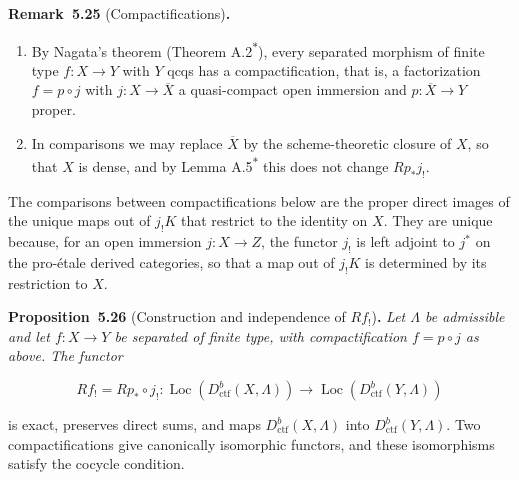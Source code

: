 \documentclass[11pt]{article}
\newenvironment{bpstatement}[2]{\par\addvspace{0.6\baselineskip}\noindent\textbf{#1}#2\textbf{.}\enspace\ignorespaces}
  {\par\addvspace{0.4\baselineskip}}
\newenvironment{bpstatementit}[2]{\begin{bpstatement}{#1}{#2}\itshape\ignorespaces}{\end{bpstatement}}
\newcommand{\bpout}[1]{#1\textsuperscript{\hyperlink{bp-outside}{\ensuremath{\ast}}}}
\providecommand{\Loc}{}\renewcommand{\Loc}{\operatorname{Loc}}
\begin{document}
\label{bp490}%
\begin{bpstatement}{Remark~5.25}{ (Compactifications)}
\begin{enumerate}
\item By Nagata's theorem (Theorem \bpout{A.2}), every separated morphism of finite type \(f:X\to Y\) with \(Y\) qcqs has a compactification, that is, a factorization \(f=p\circ j\) with \(j:X\to\overline X\) a quasi-compact open immersion and \(p:\overline X\to Y\) proper.
\item In comparisons we may replace \(\overline X\) by the scheme-theoretic closure of \(X\), so that \(X\) is dense, and by Lemma \bpout{A.5} this does not change \(Rp_*j_!\).
\end{enumerate}
\end{bpstatement}

\label{bp491}%
The comparisons between compactifications below are the proper direct images of the unique maps out of \(j_!K\) that restrict to the identity on \(X\). They are unique because, for an open immersion \(j:X\to Z\), the functor \(j_!\) is left adjoint to \(j^*\) on the pro-étale derived categories, so that a map out of \(j_!K\) is determined by its restriction to \(X\).

\label{bp492}%
\begin{bpstatementit}{Proposition~5.26}{ (Construction and independence of $Rf_!$)}
Let \(\Lambda\) be admissible and let \(f:X\to Y\) be separated of finite type, with compactification \(f=p\circ j\) as above. The functor

\[
Rf_!=Rp_*\circ j_!:\Loc(D^b_{\mathrm{ctf}}(X,\Lambda))\to\Loc(D^b_{\mathrm{ctf}}(Y,\Lambda))
\]

is exact, preserves direct sums, and maps \(D^b_{\mathrm{ctf}}(X,\Lambda)\) into \(D^b_{\mathrm{ctf}}(Y,\Lambda)\). Two compactifications give canonically isomorphic functors, and these isomorphisms satisfy the cocycle condition.
\end{bpstatementit}
\end{document}
